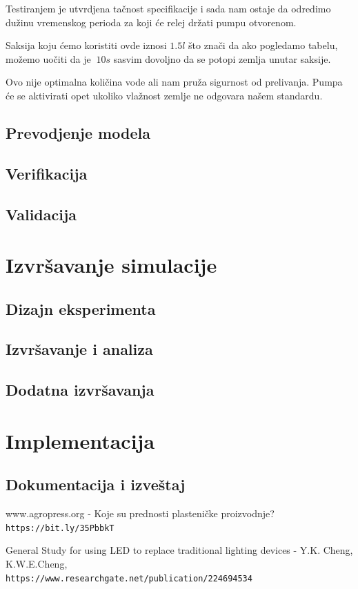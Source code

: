 \documentclass[a4paper,11pt]{book}
\begin{document}
Testiranjem je utvrdjena tačnost specifikacije i sada nam ostaje da odredimo dužinu vremenskog perioda za koji će relej držati pumpu otvorenom.

Saksija koju ćemo koristiti ovde iznosi $1.5l$ što znači da ako pogledamo tabelu, možemo uočiti da je $~10s$ sasvim dovoljno da se potopi zemlja unutar saksije.

Ovo nije optimalna količina vode ali nam pruža sigurnost od prelivanja. Pumpa će se aktivirati opet ukoliko vlažnost zemlje ne odgovara našem standardu.

\section{Prevodjenje modela}

\section{Verifikacija}
 
\section{Validacija}

\chapter{Izvršavanje simulacije}

\section{Dizajn eksperimenta}

\section{Izvršavanje i analiza}

\section{Dodatna izvršavanja}

\chapter{Implementacija}

\section{Dokumentacija i izveštaj}

\begin{thebibliography}{9}

  www.agropress.org - Koje su prednosti plasteničke proizvodnje?
  \\\texttt{https://bit.ly/35PbbkT}

   
  General Study for using LED to replace traditional lighting devices - Y.K. Cheng, K.W.E.Cheng,
  \\\texttt{https://www.researchgate.net/publication/224694534}

  \end{thebibliography}
\end{document}
